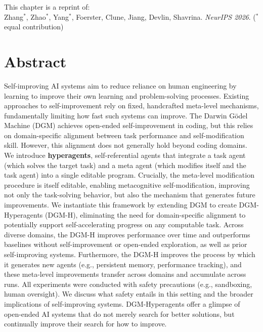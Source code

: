 %

This chapter is a reprint of: \\
Zhang$^{*}$, Zhao$^{*}$, Yang$^{*}$, Foerster, Clune, Jiang, Devlin, Shavrina.
\textit{NeurIPS 2026}. ($^{*}$equal contribution)

\section*{Abstract}

Self-improving AI systems aim to reduce reliance on human engineering by learning to improve their own learning and problem-solving processes. Existing approaches to self-improvement rely on fixed, handcrafted meta-level mechanisms, fundamentally limiting how fast such systems can improve. The Darwin G\"{o}del Machine (DGM) achieves open-ended self-improvement in coding, but this relies on domain-specific alignment between task performance and self-modification skill. However, this alignment does not generally hold beyond coding domains. We introduce \textbf{hyperagents}, self-referential agents that integrate a task agent (which solves the target task) and a meta agent (which modifies itself and the task agent) into a single editable program. Crucially, the meta-level modification procedure is itself editable, enabling metacognitive self-modification, improving not only the task-solving behavior, but also the mechanism that generates future improvements. We instantiate this framework by extending DGM to create DGM-Hyperagents (DGM-H), eliminating the need for domain-specific alignment to potentially support self-accelerating progress on any computable task. Across diverse domains, the DGM-H improves performance over time and outperforms baselines without self-improvement or open-ended exploration, as well as prior self-improving systems. Furthermore, the DGM-H improves the process by which it generates new agents (e.g., persistent memory, performance tracking), and these meta-level improvements transfer across domains and accumulate across runs. All experiments were conducted with safety precautions (e.g., sandboxing, human oversight). We discuss what safety entails in this setting and the broader implications of self-improving systems. DGM-Hyperagents offer a glimpse of open-ended AI systems that do not merely search for better solutions, but continually improve their search for how to improve.

